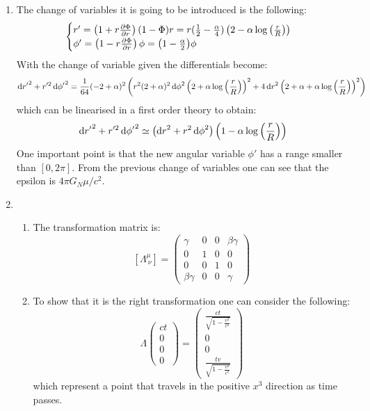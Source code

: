 \documentclass[11pt, oneside]{article}
\begin{document}
\begin{enumerate}
\item The change of variables it is going to be introduced is the following:
\[
	\begin{cases}
		r^{\prime}=\left(1+r \pdv{\Phi}{r}\right)(1-\Phi) r =  r (\frac{1}{2}-\frac{\alpha}{4})\left(2-\alpha \log \qty(\frac{r}{R})\right)\\
		\phi^{\prime}=\left(1-r \pdv{\Phi}{r} \right) \phi = \qty(1 - \frac{\alpha}{2})\phi
	\end{cases}
\]
With the change of variable given the differentials become:
\begin{align*}
	\dd{r'}^2 + r'^2 \dd{\phi'}^2 = \frac{1}{64}(-2+\alpha)^{2}\left(r^{2}(2+\alpha)^{2} \dd{\phi}^{2}\left(2+\alpha \log \qty(\frac{r}{R})\right)^{2}+4 \dd{r}^{2}\left(2+\alpha+\alpha \log \qty(\frac{r}{R})\right)^{2}\right)
\end{align*}
which can be linearised in a first order theory to obtain:
\[
	\dd{r'}^2 + r'^2 \dd{\phi'}^2 \simeq \left(\dd{r}^{2}+r^{2} \dd{\phi}^{2}\right)\left(1-\alpha \log \qty(\frac{r}{R})\right)
\]
One important point is that the new angular variable $\phi'$ has a range smaller than $[0, 2\pi]$. From the previous change of variables one can see that the epsilon is $ 4\pi G_N \mu / c^2$.

\item 
\begin{enumerate}[label=(\alph*)]
	\item The transformation matrix is:
	\[
		[\Lambda^{\mu}_{~\nu}]=\left(\begin{array}{cccc}
			\gamma & 0 & 0 & \beta \gamma \\
			0 & 1 & 0 & 0 \\
			0 & 0 & 1 & 0 \\
			\beta \gamma & 0 & 0 & \gamma
		\end{array}\right)
	\]
	\item To show that it is the right transformation one can consider the following:
	\[
		\Lambda \begin{pmatrix}
			ct \\
			0 \\
			0 \\
			0 
		\end{pmatrix} =
		\begin{pmatrix}
			\frac{c t}{\sqrt{1-\frac{v^{2}}{c^{2}}}} \\
			 0 \\
			 0 \\
			 \frac{tv}{\sqrt{1-\frac{v^{2}}{c^{2}}}}
		\end{pmatrix}
	\]
	which represent a point that travels in the positive $x^3$ direction as time passes.
	

\end{enumerate}
\end{enumerate}
\end{document}
